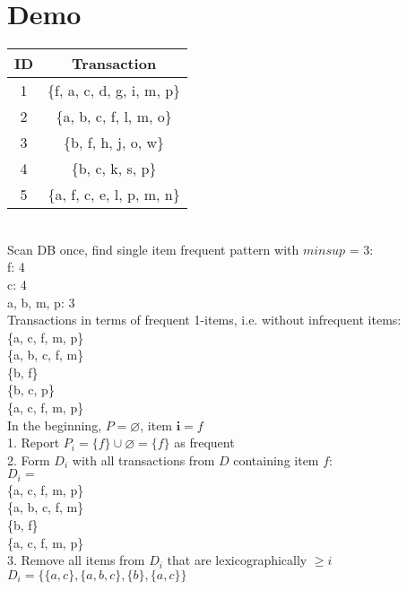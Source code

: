 \documentclass[12pt]{article}
\begin{document}
\newpage
 
\section{Demo}

\begin{tabular}{| c | c |}
\hline
ID & Transaction \\
\hline
1 & \{f, a, c, d, g, i, m, p\} \\
2 & \{a, b, c, f, l, m, o\} \\
3 & \{b, f, h, j, o, w\} \\
4 & \{b, c, k, s, p\} \\
5 & \{a, f, c, e, l, p, m, n\} \\
\hline
\end{tabular} \\

Scan DB once, find single item frequent pattern with $minsup$ = 3: \\
f: 4 \\
c: 4 \\
a, b, m, p: 3 \\

Transactions in terms of frequent 1-items, i.e. without infrequent items: \\
\{a, c, f, m, p\} \\
\{a, b, c, f, m\} \\
\{b, f\} \\
\{b, c, p\} \\
\{a, c, f, m, p\} \\

In the beginning, $P = \varnothing$, item $\textbf{i} = f$ \\

1. Report $P_i = \{f\} \cup \varnothing = \{f\}$ as frequent \\

2. Form $D_i$ with all transactions from $D$ containing item $f$: \\
$D_i = $ \\ 
\{a, c, f, m, p\} \\
\{a, b, c, f, m\} \\
\{b, f\} \\
\{a, c, f, m, p\} \\

3. Remove all items from $D_i$ that are lexicographically $\ge i$ \\
$D_i = \{\{a, c\}, \{a, b, c\}, \{b\}, \{a, c\}\}$ \\
\end{document}
